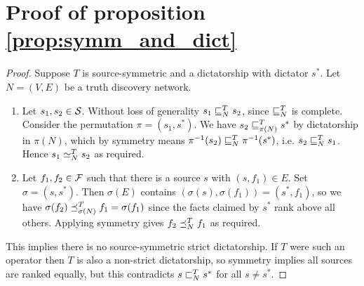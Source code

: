 \documentclass[../main.tex]{subfiles}
\begin{document}
\section{Proof of proposition \ref{prop:symm_and_dict}}
\begin{proof}

Suppose $T$ is source-symmetric and a dictatorship with dictator $s^*$. Let
$N=(V,E)$ be a truth discovery network.
\begin{enumerate}
\item
    Let $s_1, s_2 \in \S$. Without loss of generality $s_1 \sle_N^T s_2$, since
    $\sle_N^T$ is complete. Consider the permutation $\pi=(s_1, s^*)$.  We have
    $s_2 \sle_{\pi(N)}^T s^*$ by dictatorship in $\pi(N)$, which by symmetry
    means $\pi^{-1}(s_2) \sle_N^T \pi^{-1}(s^*)$, i.e. $s_2 \sle_N^T s_1$.
    Hence $s_1 \seq_N^T s_2$ as required.

\item
    Let $f_1, f_2 \in \F$ such that there is a source $s$ with $(s, f_1) \in E$.
    Set $\sigma=(s, s^*)$. Then $\sigma(E)$ contains $(\sigma(s), \sigma(f_1))
    = (s^*, f_1)$, so we have $\sigma(f_2) \fle_{\sigma(N)}^T f_1 =
    \sigma(f_1)$ since the facts claimed by $s^*$ rank above all others.
    Applying symmetry gives $f_2 \fle_N^T f_1$ as required.
\end{enumerate}

This implies there is no source-symmetric strict dictatorship. If $T$ were such
an operator then $T$ is also a non-strict dictatorship, so symmetry implies
all sources are ranked equally, but this contradicts $s \slt_N^T s^*$ for all
$s \ne s^*$.

\end{proof}
\end{document}
